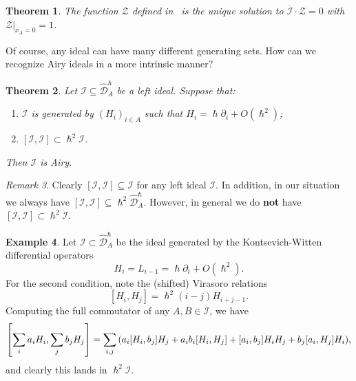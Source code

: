 \documentclass[leqno, openany]{memoir}
\newtheorem{thm}{Theorem}[section]
\theoremstyle{definition}
\newtheorem{exm}[thm]{Example}
\theoremstyle{remark}
\newtheorem{rmk}[thm]{Remark}
\theoremstyle{plain}
\theoremstyle{definition}
\theoremstyle{remark}
\newcommand{\mc}[1]{\mathcal{#1}}
\newcommand{\ol}[1]{\overline{#1}}
\newcommand{\wh}[1]{\widehat{#1}}
\begin{document}
\begin{thm}
    The function $\mc{Z}$ defined in~ is the unique solution to $\ol{\mc{I}} \cdot \mc{Z} = 0$ with $\mc{Z} |_{x_A = 0} = 1$.
\end{thm}

Of course, any ideal can have many different generating sets. How can we recognize Airy ideals in a more intrinsic manner?

\begin{thm}{\cite{airytoprec}}\label{thm:charairy}
    Let $\mc{I} \subseteq \wh{\mc{D}}_A^{\hslash}$ be a left ideal. Suppose that:
    \begin{enumerate}
        \item $\mc{I}$ is generated by $(H_i)_{i \in A}$ such that $H_i = \hslash \partial_i + O(\hslash^2)$;
        \item $[\mc{I}, \mc{I}] \subset \hslash^2 \mc{I}$.
    \end{enumerate}
    Then $\mc{I}$ is Airy.
\end{thm}

\begin{rmk}
    Clearly $[\mc{I}, \mc{I}] \subseteq \mc{I}$ for any left ideal $\mc{I}$. In addition, in our situation we always have $[\mc{I}, \mc{I}] \subseteq \hslash^2 \wh{\mc{D}}_A^{\hslash}$. However, in general we do \textbf{not} have $[\mc{I}, \mc{I}] \subset \hslash^2 \mc{I}$.
\end{rmk}

\begin{exm}
    Let $\mc{I} \subset \wh{\mc{D}}_A^{\hslash}$ be the ideal generated by the Kontsevich-Witten differential operators
    \[ H_i = L_{i-1} = \hslash \partial_i + O(\hslash^2). \]
    For the second condition, note the (shifted) Virasoro relations
    \[ [H_i, H_j] = \hslash^2 (i-j) H_{i+j-1}. \]
    Computing the full commutator of any $A, B \in \mc{I}$, we have
    \[ \qty[\sum_i a_i H_i, \sum_j b_j H_j] = \sum_{i,j} \qty(a_i [H_i, b_j] H_j + a_i b_i [H_i, H_j] + [a_i, b_j]H_i H_j + b_j [a_i, H_j] H_i), \]
    and clearly this lands in $\hslash^2 \mc{I}$.
\end{exm}
\end{document}
